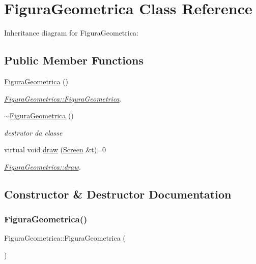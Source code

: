 \hypertarget{classFiguraGeometrica}{}\section{Figura\+Geometrica Class Reference}
\label{classFiguraGeometrica}


Inheritance diagram for Figura\+Geometrica\+:
\subsection*{Public Member Functions}
\begin{DoxyCompactItemize}
\item 
\hyperlink{classFiguraGeometrica_a81d7c7efaea511e60a15f5a363138dd9}{Figura\+Geometrica} ()
\begin{DoxyCompactList}\small\item\em \hyperlink{classFiguraGeometrica_a81d7c7efaea511e60a15f5a363138dd9}{Figura\+Geometrica\+::\+Figura\+Geometrica}. \end{DoxyCompactList}\item 
\hyperlink{classFiguraGeometrica_ad13b9bccf1b14f6b9fbc662aad61ffd1}{$\sim$\+Figura\+Geometrica} ()
\begin{DoxyCompactList}\small\item\em destrutor da classe \end{DoxyCompactList}\item 
virtual void \hyperlink{classFiguraGeometrica_a06404670d06d28d12f5f386901186925}{draw} (\hyperlink{classScreen}{Screen} \&t)=0
\begin{DoxyCompactList}\small\item\em \hyperlink{classFiguraGeometrica_a06404670d06d28d12f5f386901186925}{Figura\+Geometrica\+::draw}. \end{DoxyCompactList}\end{DoxyCompactItemize}


\subsection{Constructor \& Destructor Documentation}
\mbox{\label{classFiguraGeometrica_a81d7c7efaea511e60a15f5a363138dd9}} 
\subsubsection{\texorpdfstring{Figura\+Geometrica()}{FiguraGeometrica()}}
{\footnotesize\ttfamily Figura\+Geometrica\+::\+Figura\+Geometrica (\begin{DoxyParamCaption}{ }\end{DoxyParamCaption})}



